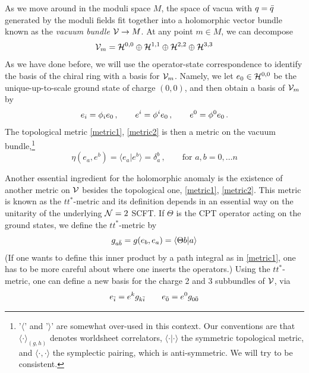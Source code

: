 As we move around in the moduli space $M$, the space of vacua with $q={\bar q}$
generated by the moduli fields fit together into a holomorphic vector bundle 
known as the {\it vacuum bundle} ${\cal V}\to M$. At any point $m\in M$, we can 
decompose
\begin{equation}
\eqlabel{decompose}
\calv_m = \calh^{0,0}\oplus \calh^{1,1}\oplus\calh^{2,2}\oplus\calh^{3,3}
\end{equation}
As we have done before, we will use the operator-state correspondence to
identify the basis of the chiral ring with a basis for ${\cal V}_m$. Namely,
we let $e_0\in {\cal H}^{0,0}$ be the unique-up-to-scale ground state of 
charge $(0,0)$, and then obtain a basis of ${\cal V}_m$ by
\begin{equation}
\eqlabel{rrbasis}
e_i = \phi_i e_0\,,\qquad e^i = \phi^i e_0\,,\qquad e^0 = \phi^0 e_0\,.
\end{equation}
The topological metric \eqref{metric1}, \eqref{metric2} is then a metric 
on the vacuum bundle,\footnote{'$\langle$' and '$\rangle$' are somewhat
over-used in this context. Our conventions are that $\langle\cdot
\rangle_{(g,h)}$ denotes worldsheet correlators, $\langle\cdot|\cdot\rangle$ 
the symmetric topological metric, and $\langle\cdot,\cdot\rangle$ the 
symplectic pairing, which is anti-symmetric. We will try to be consistent.}
\begin{equation}
\eta(e_a,e^b) = \langle e_a|e^b\rangle = \delta_{a}^b\,,\qquad
\text{for $a,b=0,\ldots n$}
\end{equation}
 
Another essential ingredient for the holomorphic anomaly is the existence
of another metric on ${\cal V}$ besides the topological one, \eqref{metric1}, 
\eqref{metric2}. This metric is known as the $tt^*$-metric and its
definition depends in an essential way on the unitarity of the underlying
${\cal N}=2$ SCFT. If $\Theta$ is the CPT operator acting on the ground states,
we define the $tt^*$-metric by \cite{ceva}
\begin{equation}
\eqlabel{ttstar}
g_{a \bb} = g(e_b,e_a) = \langle \Theta b| a \rangle
\end{equation}
(If one wants to define this inner product by a path integral as in 
\eqref{metric1}, one has to be more careful about where one inserts the
operators.) Using the $tt^*$-metric, one can define a new basis for
the charge 2 and 3 subbundles of ${\cal V}$, via
\begin{equation}
\eqlabel{newbasis}
e_\ib = e^k g_{k\ib} \qquad
e_\0b = e^0 g_{0 \0b } 
\end{equation}

